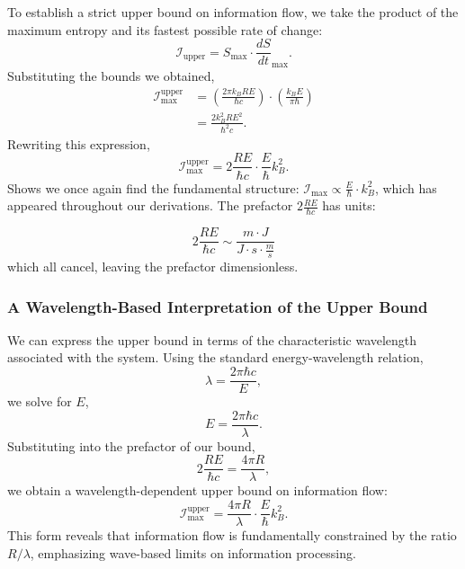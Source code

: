 \documentclass[12pt]{article}
\begin{document}
To establish a strict upper bound on information flow, we take the product of the maximum entropy and its fastest possible rate of change:
\begin{equation}
    \mathcal{I}_{\text{upper}} = S_{\max} \cdot \frac{dS}{dt}_{\max}.
\end{equation}
Substituting the bounds we obtained,
\begin{align}
    \mathcal{I}_{\text{max}}^{\text{upper}} &= \left(\frac{2\pi k_B R E}{\hbar c}\right) \cdot \left(\frac{k_B E}{\pi \hbar}\right) \nonumber \\
    &= \frac{2 k_B^2 R E^2}{\hbar^2 c}.
\end{align}
Rewriting this expression,
\begin{equation}
    \mathcal{I}_{\text{max}}^{\text{upper}} = 2 \frac{R E}{\hbar c} \cdot \frac{E}{\hbar} k_B^2.
\end{equation}
Shows we once again find the fundamental structure: \(\mathcal{I}_{\max} \propto \frac{E}{\hbar} \cdot k_B^2\), which has appeared throughout our derivations.
The prefactor $2 \frac{R E}{\hbar c}$ has units:

\begin{equation}
    2 \frac{R E}{\hbar c} \sim \frac{m \cdot J}{J \cdot s \cdot \frac{m}{s}}
\end{equation}
which all cancel, leaving the prefactor dimensionless.

\subsubsection{A Wavelength-Based Interpretation of the Upper Bound}

We can express the upper bound in terms of the characteristic wavelength associated with the system. Using the standard energy-wavelength relation,
\begin{equation}
    \lambda = \frac{2\pi \hbar c}{E},
\end{equation}
we solve for \( E \),
\begin{equation}
    E = \frac{2\pi \hbar c}{\lambda}.
\end{equation}
Substituting into the prefactor of our bound,
\begin{equation}
    2 \frac{R E}{\hbar c} = \frac{4\pi R}{\lambda},
\end{equation}
we obtain a wavelength-dependent upper bound on information flow:
\begin{equation}
    \mathcal{I}_{\text{max}}^{\text{upper}} = \frac{4\pi R}{\lambda} \cdot \frac{E}{\hbar} k_B^2.
\end{equation}
This form reveals that information flow is fundamentally constrained by the ratio \( R / \lambda \), emphasizing wave-based limits on information processing.
\end{document}
